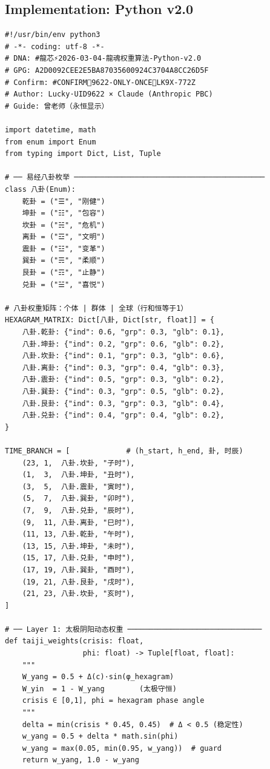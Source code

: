 \documentclass[conference]{IEEEtran}
\begin{document}
\subsection{Implementation: Python v2.0}

\begin{lstlisting}[style=python,
  caption={LongHun Dynamic Weight Algorithm — Python v2.0},
  label={lst:python}]
#!/usr/bin/env python3
# -*- coding: utf-8 -*-
# DNA: #龍芯⚡️2026-03-04-龍魂权重算法-Python-v2.0
# GPG: A2D0092CEE2E5BA87035600924C3704A8CC26D5F
# Confirm: #CONFIRM🌌9622-ONLY-ONCE🧬LK9X-772Z
# Author: Lucky·UID9622 × Claude (Anthropic PBC)
# Guide: 曾老师（永恒显示）

import datetime, math
from enum import Enum
from typing import Dict, List, Tuple

# ── 易经八卦枚举 ────────────────────────────────────────────
class 八卦(Enum):
    乾卦 = ("☰", "刚健")
    坤卦 = ("☷", "包容")
    坎卦 = ("☵", "危机")
    离卦 = ("☲", "文明")
    震卦 = ("☳", "变革")
    巽卦 = ("☴", "柔顺")
    艮卦 = ("☶", "止静")
    兑卦 = ("☱", "喜悦")

# 八卦权重矩阵：个体 | 群体 | 全球（行和恒等于1）
HEXAGRAM_MATRIX: Dict[八卦, Dict[str, float]] = {
    八卦.乾卦: {"ind": 0.6, "grp": 0.3, "glb": 0.1},
    八卦.坤卦: {"ind": 0.2, "grp": 0.6, "glb": 0.2},
    八卦.坎卦: {"ind": 0.1, "grp": 0.3, "glb": 0.6},
    八卦.离卦: {"ind": 0.3, "grp": 0.4, "glb": 0.3},
    八卦.震卦: {"ind": 0.5, "grp": 0.3, "glb": 0.2},
    八卦.巽卦: {"ind": 0.3, "grp": 0.5, "glb": 0.2},
    八卦.艮卦: {"ind": 0.3, "grp": 0.3, "glb": 0.4},
    八卦.兑卦: {"ind": 0.4, "grp": 0.4, "glb": 0.2},
}

TIME_BRANCH = [             # (h_start, h_end, 卦, 时辰)
    (23, 1,  八卦.坎卦, "子时"),
    (1,  3,  八卦.坤卦, "丑时"),
    (3,  5,  八卦.震卦, "寅时"),
    (5,  7,  八卦.巽卦, "卯时"),
    (7,  9,  八卦.兑卦, "辰时"),
    (9,  11, 八卦.离卦, "巳时"),
    (11, 13, 八卦.乾卦, "午时"),
    (13, 15, 八卦.坤卦, "未时"),
    (15, 17, 八卦.兑卦, "申时"),
    (17, 19, 八卦.巽卦, "酉时"),
    (19, 21, 八卦.艮卦, "戌时"),
    (21, 23, 八卦.坎卦, "亥时"),
]

# ── Layer 1: 太极阴阳动态权重 ───────────────────────────────
def taiji_weights(crisis: float,
                  phi: float) -> Tuple[float, float]:
    """
    W_yang = 0.5 + Δ(c)·sin(φ_hexagram)
    W_yin  = 1 - W_yang        (太极守恒)
    crisis ∈ [0,1], phi = hexagram phase angle
    """
    delta = min(crisis * 0.45, 0.45)  # Δ < 0.5 (稳定性)
    w_yang = 0.5 + delta * math.sin(phi)
    w_yang = max(0.05, min(0.95, w_yang))  # guard
    return w_yang, 1.0 - w_yang


\end{lstlisting}
\end{document}
